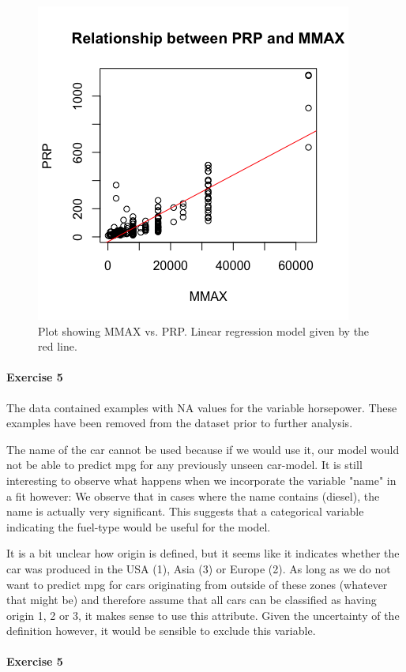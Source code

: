 \documentclass{paper}
\begin{document}
\begin{figure}[!h]
  \begin{center}
    \quad\quad
    \includegraphics[width=.6\linewidth]{prp_mmax}
  \end{center}
  \caption{Plot showing MMAX vs. PRP. Linear regression
   model given by the red line.}
   \label{fig:prp_mmax}
\end{figure}


\paragraph{Exercise 5}
The data contained examples with NA values for the variable horsepower. These
examples have been removed from the dataset prior to further analysis.

The name of the car cannot be used because if we would use it, our model would
not be able to predict mpg for any previously unseen car-model. It is still
interesting to observe what happens when we incorporate the variable "name" in a
fit however: We observe that in cases where the name contains (diesel), the name
is actually very significant. This suggests that a categorical variable indicating
the fuel-type would be useful for the model.

It is a bit unclear how origin is defined, but it seems like it indicates whether the car was
produced in the USA (1), Asia (3) or Europe (2). As long as we do not want to predict mpg for cars
originating from outside of these zones (whatever that might be) and therefore assume
that all cars can be classified as having origin 1, 2 or 3, it makes sense to use this attribute.
Given the uncertainty of the definition however, it would be sensible to exclude this
variable.


\paragraph{Exercise 5}
\end{document}
